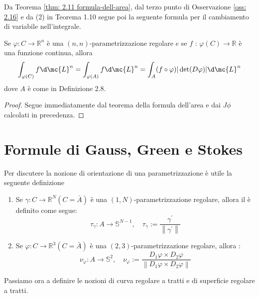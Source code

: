 Da Teorema \ref{thm: 2.11 formula-dell-area}, dal terzo punto di Osservazione \ref{oss: 2.16} e da (2) in Teorema 1.10 segue poi la seguente formula per il cambiamento di variabile nell'integrale.

\begin{corollary}[$\circ$]Se $\varphi: C \rightarrow \mathbb{R}^{n}$ è una $(n, n)$-parametrizzazione regolare $e$ se $f$ : $\varphi(C) \rightarrow \mathbb{R}$ è una funzione continua, allora
    \[\int_{\varphi(C)} f \d \mc{L}^{n}=\int_{\varphi(A)} f \d \mc{L}^{n}=\int_{A}(f \circ \varphi)|\operatorname{det}(D \varphi)| \d \mc{L}^{n}\]
    dove $A$ è come in Definizione 2.8.
\end{corollary}
\begin{proof}
    Segue immediatamente dal teorema della formula dell'area e dai $J\phi$ calcolati in precedenza.
\end{proof}

\section{Formule di Gauss, Green e Stokes}
Per discutere la nozione di orientazione di una parametrizzazione è utile la seguente definizione

\begin{boxdef}
    \begin{enumerate}
        \item Se $\gamma: C \rightarrow \mathbb{R}^{N}(C=\bar{A})$ è una $(1, N)$-parametrizzazione regolare, allora il  è definito come segue:
        \[
        \tau_{\gamma}: A \rightarrow \mathbb{S}^{N-1}, \quad \tau_{\gamma}:=\frac{\gamma^{\prime}}{\left\|\gamma^{\prime}\right\|}
        \]
        \item Se $\varphi: C \rightarrow \mathbb{R}^{3}(C=\bar{A})$ è una $(2,3)$-parametrizzazione regolare, allora :
        \[
        \nu_{\varphi}: A \rightarrow \mathbb{S}^{2}, \quad \nu_{\varphi}:=\frac{D_{1} \varphi \times D_{2} \varphi}{\left\|D_{1} \varphi \times D_{2} \varphi\right\|}
        \]
    \end{enumerate}
\end{boxdef}
Passiamo ora a definire le nozioni di curva regolare a tratti e di superficie regolare a tratti.

